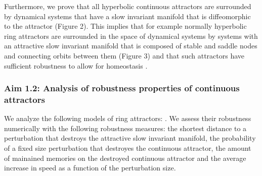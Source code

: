 \documentclass[12pt,letterpaper, onecolumn]{article}
\theoremstyle{definition}
\theoremstyle{remark}
\begin{document}




Furthermore, we prove that all hyperbolic continuous attractors are surrounded by dynamical systems that have a slow invariant manifold that is diffeomorphic to the attractor (Figure 2). %
This implies that for example normally hyperbolic ring attractors are surrounded in the space of dynamical systems by systems with an attractive slow invariant manifold that is composed of stable and saddle nodes and connecting orbits between them (Figure 3) and that such attractors have sufficient robustness to allow for homeostasis \citep{oleary2018homeostasis, niemeyer2021, kozachkov2022a, seeholzer2019}.



\subsubsection*{Aim 1.2: Analysis of robustness properties of continuous attractors}
 We analyze the following models of ring attractors: \citep{pollock2020, barak2021mapping, beiran2021, noorman2022}.
We assess their robustness numerically with the following robustness measures:
the shortest distance to a perturbation that destroys the attractive slow invariant manifold,
the probability of a fixed size perturbation that destroyes the continuous attractor,
the amount of mainained memories on the destroyed continuous attractor and
the average increase in speed as a function of the perturbation size.
\end{document}

